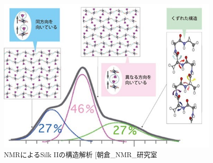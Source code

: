\documentclass[dvipdfmx,12pt,a4paper]{jreport}
\makeatletter
\DeclareRobustCommand\cite{\unskip
    	\@ifnextchar[{\@tempswatrue\@citex}{\@tempswafalse\@citex[]}}
\makeatother
\begin{document}
		\begin{figure}[h]
			\centering
			\includegraphics[scale=0.8]{NMR_silk_II.jpg}
			\caption{NMRによるSilk IIの構造解析\cite{朝倉_NMR_研究室}}
		\end{figure}

		
		
		\newpage
\end{document}
